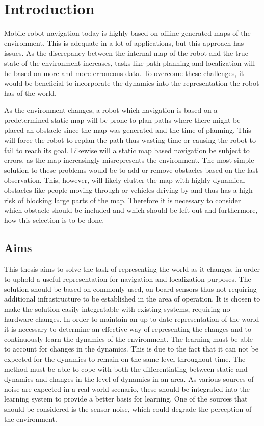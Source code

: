 \chapter{Introduction}

Mobile robot navigation today is highly based on offline generated maps of the environment. 
This is adequate in a lot of applications, but this approach has issues. 
As the discrepancy between the internal map of the robot and the true state of the environment increases, tasks like path planning and localization will be based on more and more erroneous data. 
To overcome these challenges, it would be beneficial to incorporate the dynamics into the representation the robot has of the world.

As the environment changes, a robot which navigation is based on a predetermined static map will be prone to plan paths where there might be placed an obstacle since the map was generated and the time of planning. 
This will force the robot to replan the path thus wasting time or causing the robot to fail to reach its goal. Likewise will a static map based navigation be subject to errors, as the map increasingly misrepresents the environment. 
The most simple solution to these problems would be to add or remove obstacles based on the last observation. This, however, will likely clutter the map with highly dynamical obstacles like people moving through or vehicles driving by and thus has a high risk of blocking large parts of the map. 
Therefore it is necessary to consider which obstacle should be included and which should be left out and furthermore, how this selection is to be done.

\section{Aims}
This thesis aims to solve the task of representing the world as it changes, in order to uphold a useful representation for navigation and localization purposes. 
The solution should be based on commonly used, on-board sensors thus not requiring additional infrastructure to be established in the area of operation. 
It is chosen to make the solution easily integratable with existing systems, requiring no hardware changes. 
In order to maintain an up-to-date representation of the world it is necessary to determine an effective way of representing the changes and to continuously learn the dynamics of the environment. 
The learning must be able to account for changes in the dynamics. 
This is due to the fact that it can not be expected for the dynamics to remain on the same level throughout time. The method must be able to cope with both the differentiating between static and dynamics and changes in the level of dynamics in an area. 
As various sources of noise are expected in a real world scenario, these should be integrated into the learning system to provide a better basis for learning. One of the sources that should be considered is the sensor noise, which could degrade the perception of the environment. 

